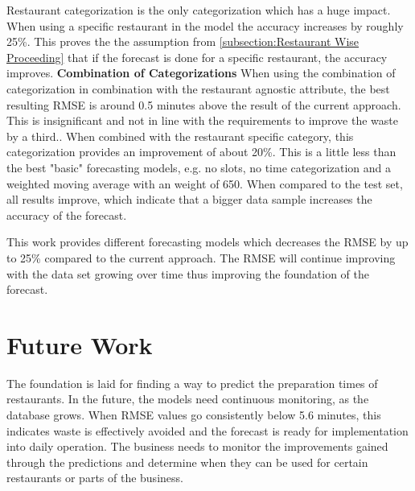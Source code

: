 Restaurant categorization is the only categorization which has a huge impact. When using a specific restaurant in the model the accuracy increases by roughly 25\%. This proves the the assumption from \ref{subsection:Restaurant Wise Proceeding} that if the forecast is done for a specific restaurant, the accuracy improves.
\newline\textbf{Combination of Categorizations}\newline
When using the combination of categorization in combination with the restaurant agnostic attribute, the best resulting RMSE is around 0.5 minutes above the result of the current approach. This is insignificant and not in line with the requirements to improve the waste by a third..\newline
When combined with the restaurant specific category, this categorization provides an improvement of about 20\%. This is a little less than the best "basic" forecasting models, e.g. no slots, no time categorization and a weighted moving average with an weight of 650. When compared to the test set, all results improve, which indicate that a bigger data sample increases the accuracy of the forecast.

\newline\newline
This work provides different forecasting models which decreases the RMSE by up to 25\% compared to the current approach. The RMSE will continue improving with the data set growing over time thus improving the foundation of the forecast.
\section{Future Work}
The foundation is laid for finding a way to predict the preparation times of restaurants. In the future, the models need continuous monitoring, as the database grows. When RMSE values go consistently below 5.6 minutes, this indicates waste is effectively avoided and the forecast is ready for implementation into daily operation.\newline
The business needs to monitor the improvements gained through the predictions and determine when they can be used for certain restaurants or parts of the business.
